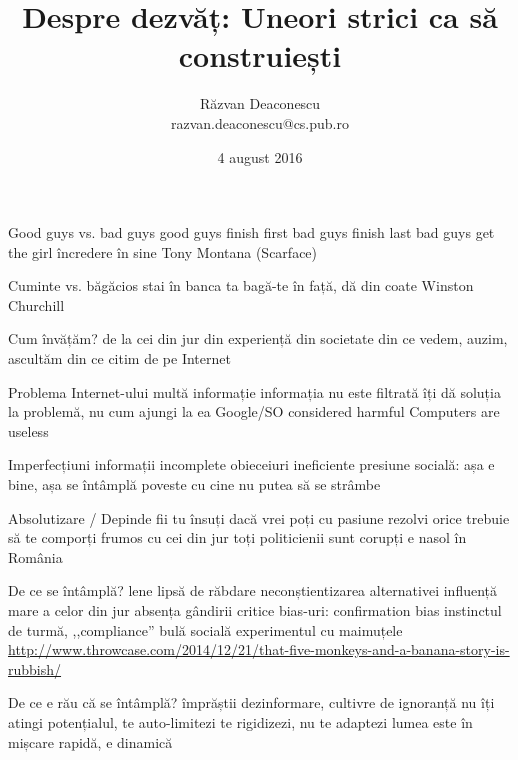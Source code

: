 \documentclass{beamer}
\title[Despre dezvăț]{Despre dezvăț: Uneori strici ca să construiești}
\institute{Info Educație 2016 (Gălăciuc, Vrancea)}
\author[Răzvan Deaconescu]{Răzvan Deaconescu \\
razvan.deaconescu@cs.pub.ro}
\date{4 august 2016}
\begin{document}
\frame{\titlepage}

\begin{frame}{Good guys vs. bad guys}
  good guys finish first
  bad guys finish last
  bad guys get the girl
  încredere în sine
  Tony Montana (Scarface)
\end{frame}

\begin{frame}{Cuminte vs. băgăcios}
  stai în banca ta
  bagă-te în față, dă din coate
  Winston Churchill
\end{frame}

\begin{frame}{Cum învățăm?}
  de la cei din jur
  din experiență
  din societate
  din ce vedem, auzim, ascultăm
  din ce citim
  de pe Internet
\end{frame}

\begin{frame}{Problema Internet-ului}
  multă informație
  informația nu este filtrată
  îți dă soluția la problemă, nu cum ajungi la ea
  Google/SO considered harmful
  Computers are useless
\end{frame}

\begin{frame}{Imperfecțiuni}
  informații incomplete
  obieceiuri ineficiente
  presiune socială: așa e bine, așa se întâmplă
  poveste cu cine nu putea să se strâmbe
\end{frame}

\begin{frame}{Absolutizare / Depinde}
  fii tu însuți
  dacă vrei poți
  cu pasiune rezolvi orice
  trebuie să te comporți frumos cu cei din jur
  toți politicienii sunt corupți
  e nasol în România
\end{frame}

\begin{frame}{De ce se întâmplă?}
  lene
  lipsă de răbdare
  neconștientizarea alternativei
  influență mare a celor din jur
  absența gândirii critice
  bias-uri: confirmation bias
  instinctul de turmă, ,,compliance''
  bulă socială
  experimentul cu maimuțele
  \url{http://www.throwcase.com/2014/12/21/that-five-monkeys-and-a-banana-story-is-rubbish/}
\end{frame}

\begin{frame}{De ce e rău că se întâmplă?}
  împrăștii dezinformare, cultivre de ignoranță
  nu îți atingi potențialul, te auto-limitezi
  te rigidizezi, nu te adaptezi
  lumea este în mișcare rapidă, e dinamică
\end{frame}
\end{document}

